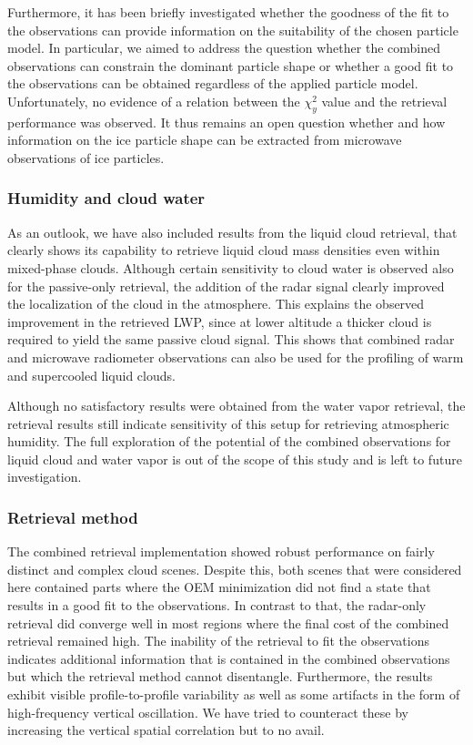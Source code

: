 \documentclass[journal abbreviation, manuscript]{copernicus}
\begin{document}
Furthermore, it has been briefly investigated whether the goodness of the fit to
the observations can provide information on the suitability of the chosen
particle model. In particular, we aimed to address the question whether the
combined observations can constrain the dominant particle shape or whether a
good fit to the observations can be obtained regardless of the applied particle
model. Unfortunately, no evidence of a relation between the $\chi^2_y$ value and
the retrieval performance was observed. It thus remains an open question whether
and how information on the ice particle shape can be extracted from microwave
observations of ice particles.

\subsubsection{Humidity and cloud water}

As an outlook, we have also included results from the liquid cloud retrieval,
that clearly shows its capability to retrieve liquid cloud mass densities even
within mixed-phase clouds. Although certain sensitivity to cloud water is
observed also for the passive-only retrieval, the addition of the radar signal
clearly improved the localization of the cloud in the atmosphere. This explains
the observed improvement in the retrieved LWP, since at lower altitude a thicker
cloud is required to yield the same passive cloud signal. This shows that
combined radar and microwave radiometer observations can also be used for the
profiling of warm and supercooled liquid clouds.

Although no satisfactory results were obtained from the water vapor retrieval,
the retrieval results still indicate sensitivity of this setup for retrieving
atmospheric humidity. The full exploration of the potential of the combined
observations for liquid cloud and water vapor is out of the scope of this study
and is left to future investigation.

\subsubsection{Retrieval method}

The combined retrieval implementation showed robust performance on fairly
distinct and complex cloud scenes. Despite this, both scenes that were
considered here contained parts where the OEM minimization did not find a state
that results in a good fit to the observations. In contrast to that, the
radar-only retrieval did converge well in most regions where the final cost of
the combined retrieval remained high. The inability of the retrieval to fit the
observations indicates additional information that is contained in the combined
observations but which the retrieval method cannot disentangle. Furthermore, the
results exhibit visible profile-to-profile variability as well as some artifacts
in the form of high-frequency vertical oscillation. We have tried to counteract
these by increasing the vertical spatial correlation but to no avail.
\end{document}
